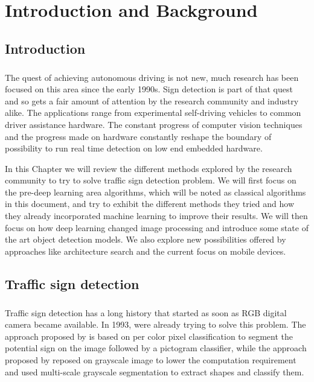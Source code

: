 \chapter{Introduction and Background}
\label{litreview}

\section{Introduction}
\paragraph{}
The quest of achieving autonomous driving is not new, much research has been focused on this area since the early 1990s. Sign detection is part of that quest and so gets a fair amount of attention by the research community and industry alike. The applications range from experimental self-driving vehicles to common driver assistance hardware. The constant progress of computer vision techniques and the progress made on hardware constantly reshape the boundary of possibility to run real time detection on low end embedded hardware.

In this Chapter we will review the different methods explored by the research community to try to solve traffic sign detection problem. We will first focus on the pre-deep learning area algorithms, which will be noted as classical algorithms in this document, and try to exhibit the different methods they tried and how they already incorporated machine learning to improve their results. We will then focus on how deep learning changed image processing and introduce some state of the art object detection models. We also explore new possibilities offered by approaches like architecture search and the current focus on mobile devices.

\section{Traffic sign detection}
\paragraph{}
Traffic sign detection has a long history that started as soon as RGB digital camera became available. In 1993, \cite{janssen1993hybrid, besserer1993shape} were already trying to solve this problem. The approach proposed by \cite{janssen1993hybrid} is based on per color pixel classification to segment the potential sign on the image followed by a pictogram classifier, while the approach proposed by \cite{besserer1993shape} reposed on grayscale image to lower the computation requirement and used multi-scale grayscale segmentation to extract shapes and classify them.

